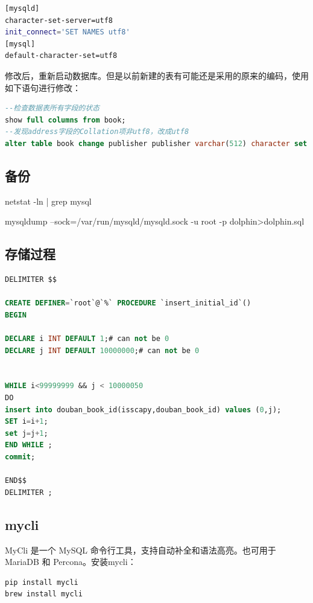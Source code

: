 \documentclass[letter]{book}
\begin{document}
\begin{lstlisting}[language=Bash]
[mysqld]
character-set-server=utf8
init_connect='SET NAMES utf8'
[mysql]
default-character-set=utf8
\end{lstlisting}

修改后，重新启动数据库。但是以前新建的表有可能还是采用的原来的编码，使用如下语句进行修改：

\begin{lstlisting}[language=SQL]
--检查数据表所有字段的状态	
show full columns from book; 
--发现address字段的Collation项非utf8，改成utf8
alter table book change publisher publisher varchar(512) character set utf8 collate utf8_unicode_ci not null;
\end{lstlisting}

\subsection{备份}

netstat -ln | grep mysql

mysqldump --sock=/var/run/mysqld/mysqld.sock -u root -p dolphin>dolphin.sql

\subsection{存储过程}

\begin{lstlisting}[language=SQL]
DELIMITER $$

CREATE DEFINER=`root`@`%` PROCEDURE `insert_initial_id`()
BEGIN  

DECLARE i INT DEFAULT 1;# can not be 0  
DECLARE j INT DEFAULT 10000000;# can not be 0  


WHILE i<99999999 && j < 10000050
DO  
insert into douban_book_id(isscapy,douban_book_id) values (0,j);  
SET i=i+1;  
set j=j+1;
END WHILE ;  
commit;  

END$$
DELIMITER ;
\end{lstlisting}


\subsection{mycli}

MyCli 是一个 MySQL 命令行工具，支持自动补全和语法高亮。也可用于 MariaDB 和 Percona。安装mycli：

\begin{lstlisting}[language=Bash]
pip install mycli
brew install mycli
\end{lstlisting}
\end{document}
